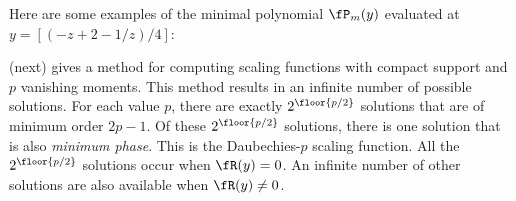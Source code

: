 \begin{example}
\label{tbl:Pyz}
Here are some examples of the minimal polynomial $\fP_m(y)$ evaluated at
$y=[(-z+2-1/z)/4]$:
\end{example}




 (next)
gives a method for computing scaling functions with compact support
and $p$ vanishing moments.
This method results in an infinite number of possible solutions.
For each value $p$, there are exactly
$2^\floor{p/2}$ solutions that are of minimum order
$2p-1$.
Of these $2^\floor{p/2}$ solutions, there is one solution that
is also {\em minimum phase}.
This is the Daubechies-$p$ scaling function.
All the $2^\floor{p/2}$ solutions occur when
$\fR(y)=0$.
An infinite number of other solutions are also available when
$\fR(y)\ne 0$.


